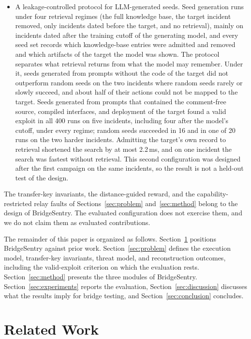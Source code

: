 \documentclass[a4paper]{cas-sc}
\begin{document}
\begin{itemize}
    \item A leakage-controlled protocol for LLM-generated seeds. Seed generation runs under four retrieval regimes (the full knowledge base, the target incident removed, only incidents dated before the target, and no retrieval), mainly on incidents dated after the training cutoff of the generating model, and every seed set records which knowledge-base entries were admitted and removed and which artifacts of the target the model was shown. The protocol separates what retrieval returns from what the model may remember. Under it, seeds generated from prompts without the code of the target did not outperform random seeds on the two incidents where random seeds rarely or slowly succeed, and about half of their actions could not be mapped to the target. Seeds generated from prompts that contained the comment-free source, compiled interfaces, and deployment of the target found a valid exploit in all 400 runs on five incidents, including four after the model's cutoff, under every regime; random seeds succeeded in 16 and in one of 20 runs on the two harder incidents. Admitting the target's own record to retrieval shortened the search by at most 2.2\,ms, and on one incident the search was fastest without retrieval. This second configuration was designed after the first campaign on the same incidents, so the result is not a held-out test of the design.
\end{itemize}
The transfer-key invariants, the distance-guided reward, and the capability-restricted relay faults of Sections~\ref{sec:problem} and~\ref{sec:method} belong to the design of BridgeSentry. The evaluated configuration does not exercise them, and we do not claim them as evaluated contributions.

The remainder of this paper is organized as follows. Section~\ref{sec:related} positions BridgeSentry against prior work. Section~\ref{sec:problem} defines the execution model, transfer-key invariants, threat model, and reconstruction outcomes, including the valid-exploit criterion on which the evaluation rests. Section~\ref{sec:method} presents the three modules of BridgeSentry. Section~\ref{sec:experiments} reports the evaluation, Section~\ref{sec:discussion} discusses what the results imply for bridge testing, and Section~\ref{sec:conclusion} concludes.

\section{Related Work}\label{sec:related}
\end{document}
